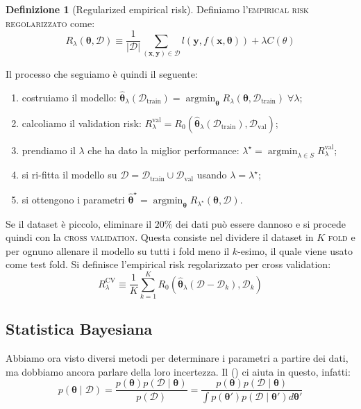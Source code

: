 \documentclass[10pt]{article}
\DeclareMathOperator*{\argmin}{argmin}
\newcommand{\ve}[1]{\bm{#1}}
\newcommand{\im}[1]{\textsc{#1}}
\newcommand{\cond}{\mid}
\newcommand{\pare}[1]{
	\ensuremath{\left(#1\right)}
}
\newcommand{\Crefn}[1]{\Cref{#1} (\nameref{#1})}
\theoremstyle{definition}
\newtheorem{definition}{Definizione}[section]
\begin{document}
\begin{definition}[Regularized empirical risk]
Definiamo l'\im{empirical risk regolarizzato} come:
\begin{equation}
R_\lambda\pare{\ve{\theta}, \mathcal{D}} \equiv \frac{1}{\left|\mathcal{D}\right|}\sum_{\pare{\ve{x}, \ve{y}}\in\mathcal{D}} l\pare{\ve{y}, f\pare{\ve{x}, \ve{\theta}}} + \lambda C\pare{\theta}
\end{equation}
\end{definition}
\noindent
Il processo che seguiamo è quindi il seguente:
\begin{enumerate}
\item costruiamo il modello: $\hat{\ve{\theta}}_\lambda\pare{\mathcal{D}_\text{train}} = \argmin_{\ve{\theta}} R_\lambda\pare{\ve{\theta}, \mathcal{D}_{\text{train}}}\;\forall\lambda$;
\item calcoliamo il validation risk: $R_\lambda^\text{val} = R_0\pare{\hat{\ve{\theta}}_\lambda\pare{\mathcal{D}_\text{train}}, \mathcal{D}_\text{val}}$;
\item prendiamo il \(\lambda\) che ha dato la miglior performance: \(\lambda^\star = \argmin_{\lambda\in S} R_\lambda^\text{val}\);
\item si ri-fitta il modello su \(\mathcal{D} = \mathcal{D}_\text{train}\cup\mathcal{D}_\text{val}\) usando \( \lambda=\lambda^\star \);
\item si ottengono i parametri \(\hat{\ve{\theta}}^\star = \argmin_{\ve{\theta}} R_{\lambda^\star}\pare{\ve{\theta}, \mathcal{D}}\).
\end{enumerate}

    Se il dataset è piccolo, eliminare il \( 20\% \) dei dati può essere dannoso e si procede quindi con la \im{cross validation}. Questa consiste nel dividere il dataset in $K$ \im{fold} e per ognuno allenare il modello su tutti i fold meno il \(k\)-esimo, il quale viene usato come test fold. Si definisce l'empirical risk regolarizzato per cross validation:
    \begin{equation}
    R_\lambda^\text{CV} \equiv \frac{1}{K} \sum_{k=1}^K R_0\pare{\hat{\ve{\theta}}_\lambda\pare{\mathcal{D} - \mathcal{D}_k}, \mathcal{D}_k}
    \end{equation}

\subsection{Statistica Bayesiana}
    Abbiamo ora visto diversi metodi per determinare i parametri a partire dei dati, ma dobbiamo
    ancora parlare della loro incertezza. Il \Crefn{teo:bayes} ci aiuta in questo, infatti:
    \begin{equation}
        p\pare{\ve{\theta}\cond \mathcal{D}} = \frac{p\pare{\ve{\theta}} p\pare{\mathcal{D}\cond\ve{\theta}}}{p\pare{\mathcal{D}}} = \frac{p\pare{\ve{\theta}} p\pare{\mathcal{D}\cond\ve{\theta}}}{\int p\pare{\ve{\theta}'}p\pare{\mathcal{D}\cond\ve{\theta}'}d\ve{\theta}'}
    \end{equation}
\end{document}
